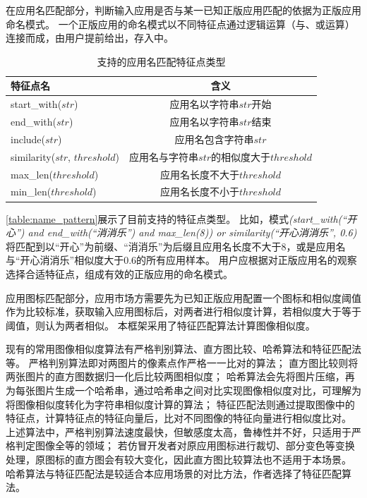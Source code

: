 在应用名匹配部分，判断输入应用是否与某一已知正版应用匹配的依据为正版应用命名模式。
一个正版应用的命名模式以不同特征点通过逻辑运算（与、或运算）连接而成，由用户提前给出，存入\componentE 中。

\begin{table}[htbp]
    \renewcommand{\arraystretch}{1}
    \footnotesize
    \centering
    \caption{\mytool 支持的应用名匹配特征点类型}
    \vspace{1mm}
    \begin{tabular}{l c}
        \toprule
        {\bf 特征点名}                 & {\bf 含义}                                 \\
        \midrule
        start\_with($str$)             & 应用名以字符串$str$开始                    \\
        end\_with($str$)               & 应用名以字符串$str$结束                    \\
        include($str$)                 & 应用名包含字符串$str$                      \\
        similarity($str$, $threshold$) & 应用名与字符串$str$的相似度大于$threshold$ \\
        max\_len($threshold$)          & 应用名长度不大于$threshold$                \\
        min\_len($threshold$)          & 应用名长度不小于$threshold$                \\
        \bottomrule
    \end{tabular}
    \label{table:name_pattern}
\end{table}

\autoref{table:name_pattern}展示了\mytool 目前支持的特征点类型。
比如，模式\textit{(start\_with(``开心'') and end\_with(``消消乐'') and max\_len(8)) or similarity(``开心消消乐'', 0.6)}将匹配到以``开心''为前缀、``消消乐''为后缀且应用名长度不大于8，或是应用名与``开心消消乐''相似度大于0.6的所有应用样本。
用户应根据对正版应用名的观察选择合适特征点，组成有效的正版应用的命名模式。

应用图标匹配部分，应用市场方需要先为已知正版应用配置一个图标和相似度阈值作为比较标准，\componentA 获取输入应用图标后，对两者进行相似度计算，若相似度大于等于阈值，则认为两者相似。
本框架采用了特征匹配算法计算图像相似度。

现有的常用图像相似度算法有严格判别算法、直方图比较、哈希算法和特征匹配法等。
严格判别算法即对两图片的像素点作严格一一比对的算法；
直方图比较则将两张图片的直方图数据归一化后比较两图相似度；
哈希算法会先将图片压缩，再为每张图片生成一个哈希串，通过哈希串之间对比实现图像相似度对比，可理解为将图像相似度转化为字符串相似度计算的算法；
特征匹配法则通过提取图像中的特征点，计算特征点的特征向量后，比对不同图像的特征向量进行相似度比对。
上述算法中，严格判别算法速度最快，但敏感度太高，鲁棒性并不好，只适用于严格判定图像全等的领域；
若仿冒开发者对原应用图标进行裁切、部分变色等变换处理，原图标的直方图会有较大变化，因此直方图比较算法也不适用于本场景。
哈希算法与特征匹配法是较适合本应用场景的对比方法，作者选择了特征匹配算法。

